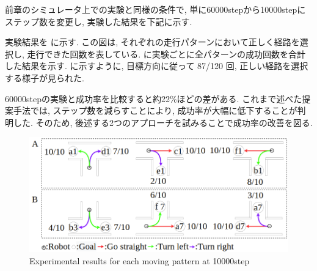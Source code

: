 





前章のシミュレータ上での実験と同様の条件で, 単に60000stepから10000stepにステップ数を変更し, 実験した結果を下記に示す.

実験結果を  に示す. この図は, それぞれの走行パターンにおいて正しく経路を選択し, 走行できた回数を表している.  に実験ごとに全パターンの成功回数を合計した結果を示す.  に示すように, 目標方向に従って 87/120 回, 正しい経路を選択する様子が見られた.

60000stepの実験と成功率を比較すると約22\%ほどの差がある. これまで述べた提案手法では, ステップ数を減らすことにより, 成功率が大幅に低下することが判明した. そのため, 後述する2つのアプローチを試みることで成功率の改善を図る.

\vspace{0.5cm}

\begin{figure}[hbtp]
  \centering
 \includegraphics[keepaspectratio, scale=0.43]
      {images/10000step.png}
 \caption{Experimental results for each moving pattern at 10000step}
 \label{Fig:10000step}
\end{figure}  


